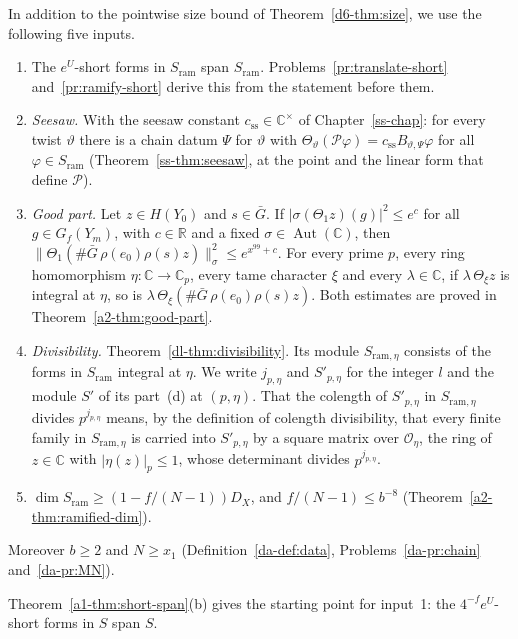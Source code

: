 \documentclass[reqno]{amsart}
\newcounter{chap}
\theoremstyle{definition}
\theoremstyle{plain}
\theoremstyle{definition}
\newcommand{\R}{\mathbb{R}}
\newcommand{\C}{\mathbb{C}}
\newcommand{\Sram}{S_{\mathrm{ram}}}
\newcommand{\Oc}{\mathcal{O}}
\newcommand{\Gb}{\bar G}
\newcommand{\Aut}{\operatorname{Aut}}
\begin{document}
In addition to the pointwise size bound of Theorem~\ref{d6-thm:size}, we use the following five inputs.
\begin{enumerate}
\item The \(e^U\)-short forms in \(\Sram\) span \(\Sram\).  Problems~\ref{pr:translate-short} and~\ref{pr:ramify-short} derive this from the statement before them.
\item \emph{Seesaw.}  With the seesaw constant \(c_{\mathrm{ss}} \in \C^\times\) of Chapter~\ref{ss-chap}: for every twist \(\vartheta\) there is a chain datum \(\Psi\) for \(\vartheta\) with \(\Theta_\vartheta(\mathcal{P}\varphi) = c_{\mathrm{ss}}B_{\vartheta,\Psi}\varphi\) for all \(\varphi \in \Sram\) (Theorem~\ref{ss-thm:seesaw}, at the point and the linear form that define \(\mathcal P\)).
\item \emph{Good part.}  Let \(z \in H(Y_0)\) and \(s \in \Gb\).  If \(\lvert\sigma(\Theta_1 z)(g)\rvert^2 \le e^c\) for all \(g \in G_f(Y_m)\), with \(c \in \R\) and a fixed \(\sigma \in \Aut(\C)\), then \(\lVert\Theta_1(\#\Gb\,\rho(e_0)\rho(s)z)\rVert_\sigma^2 \le e^{x^{99} + c}\).  For every prime \(p\), every ring homomorphism \(\eta\colon \C \to \C_p\), every tame character \(\xi\) and every \(\lambda \in \C\), if \(\lambda\,\Theta_\xi z\) is integral at \(\eta\), so is \(\lambda\,\Theta_\xi(\#\Gb\,\rho(e_0)\rho(s)z)\).  Both estimates are proved in Theorem~\ref{a2-thm:good-part}.
\item \emph{Divisibility.}  Theorem~\ref{dl-thm:divisibility}.  Its module \(S_{\mathrm{ram},\eta}\) consists of the forms in \(\Sram\) integral at \(\eta\).  We write \(j_{p,\eta}\) and \(S'_{p,\eta}\) for the integer \(l\) and the module \(S'\) of its part~(d) at \((p, \eta)\).  That the colength of \(S'_{p,\eta}\) in \(S_{\mathrm{ram},\eta}\) divides \(p^{j_{p,\eta}}\) means, by the definition of colength divisibility, that every finite family in \(S_{\mathrm{ram},\eta}\) is carried into \(S'_{p,\eta}\) by a square matrix over \(\Oc_\eta\), the ring of \(z \in \C\) with \(\lvert\eta(z)\rvert_p \le 1\), whose determinant divides \(p^{j_{p,\eta}}\).
\item \(\dim \Sram \ge (1 - f/(N - 1))D_X\), and \(f/(N - 1) \le b^{-8}\) (Theorem~\ref{a2-thm:ramified-dim}).
\end{enumerate}
Moreover \(b \ge 2\) and \(N \ge x_1\) (Definition~\ref{da-def:data}, Problems~\ref{da-pr:chain} and~\ref{da-pr:MN}).

Theorem~\ref{a1-thm:short-span}(b) gives the starting point for input~1: the \(4^{-f}e^U\)-short forms in \(S\) span \(S\).
\end{document}
